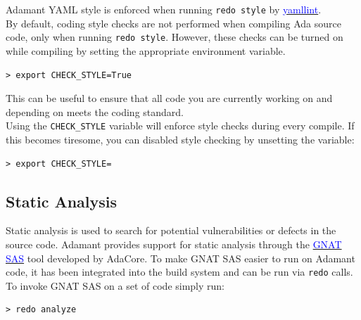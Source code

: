 Adamant YAML style is enforced when running \texttt{redo style} by \href{https://yamllint.readthedocs.io/en/stable/}{\textcolor{blue}{yamllint}}. \\

By default, coding style checks are not performed when compiling Ada source code, only when running \texttt{redo style}. However, these checks can be turned on while compiling by setting the appropriate environment variable.

\vspace{5mm} %
\begin{verbatim}
> export CHECK_STYLE=True
\end{verbatim}
\vspace{5mm} %

This can be useful to ensure that all code you are currently working on and depending on meets the coding standard. \\

Using the \texttt{CHECK\_STYLE} variable will enforce style checks during every compile. If this becomes tiresome, you can disabled style checking by unsetting the variable:

\vspace{5mm} %
\begin{verbatim}
> export CHECK_STYLE=
\end{verbatim}
\vspace{5mm} %

\subsection{Static Analysis} \label{Static Analysis}

Static analysis is used to search for potential vulnerabilities or defects in the source code. Adamant provides support for static analysis through the \href{https://www.adacore.com/static-analysis-suite}{\textcolor{blue}{GNAT SAS}} tool developed by AdaCore. To make GNAT SAS easier to run on Adamant code, it has been integrated into the build system and can be run via \texttt{redo} calls. \\

To invoke GNAT SAS on a set of code simply run:

\vspace{5mm} %
\begin{verbatim}
> redo analyze
\end{verbatim}
\vspace{5mm} %

